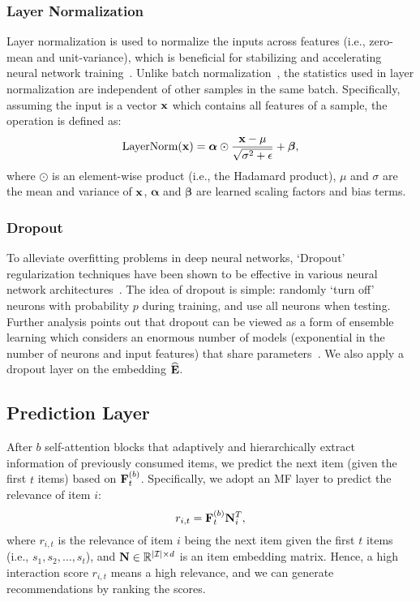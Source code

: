 \documentclass[conference]{IEEEtran}
\def\x{{\bf x}}
\def\E{{\bf E}}
\def\F{{\bf F}}
\def\N{{\bf N}}
\newcommand{\xhdr}[1]{\subsubsection*{\bf #1}}
\begin{document}
\xhdr{Layer Normalization} Layer normalization is 
used
to normalize the inputs across features (i.e., zero-mean and unit-variance), which is beneficial for stabilizing and accelerating 
neural network training~\cite{DBLP:journals/corr/BaKH16}. Unlike 
batch normalization~\cite{DBLP:conf/icml/IoffeS15}, the statistics used in layer normalization are independent of other samples in the same batch. Specifically, assuming the input is a vector $\x$ which contains all features of a sample, the operation is defined as:
\[\text{LayerNorm}(\x)=\bm{\alpha}\odot\frac{\x-\mu}{\sqrt{\sigma^2+\epsilon}}+\bm{\beta},\]
where $\odot$ is an element-wise product (i.e., the Hadamard product), $\mu$ and $\sigma$ 
are
the mean and variance of $\x$, $\bm{\alpha}$ and $\bm{\beta}$ are learned scaling factors and bias terms.

\xhdr{Dropout} To alleviate 
overfitting problems in deep neural networks, 
`Dropout' regularization techniques have
been shown to be effective in various neural network
architectures~\cite{DBLP:journals/jmlr/SrivastavaHKSS14}. The idea of dropout is simple: randomly
`turn off'
neurons with probability $p$ during
training, and 
use 
all neurons when testing. Further analysis points out that dropout can be viewed as a form of ensemble learning which considers
an
enormous number of models (exponential in the number of neurons and input features) that share parameters~\cite{DBLP:journals/corr/Warde-FarleyGCB13}. We also apply a dropout layer on the embedding $\widehat{\E}$.


\subsection{Prediction Layer}
After $b$ self-attention blocks that adaptively and hierarchically extract information of previously 
consumed
items, we predict the next item (given the first $t$ items) based on $\F_t^{(b)}$. Specifically, we adopt an MF layer to predict the relevance of item $i$:
\[r_{i,t}=\F_t^{(b)}\N_i^T,\]
where $r_{i,t}$ is the relevance of item $i$ being the next item given the first $t$ items (i.e., $s_1,s_2,\ldots,s_t$), and $\N\in\mathbb{R}^{|\mathcal{I}|\times d}$ is an item embedding matrix. Hence, a high interaction score $r_{i,t}$ means a high relevance, and we can generate recommendations by ranking the scores.
\end{document}
